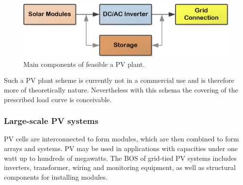 \begin{figure}[!h] 
\centering
\includegraphics[width=0.75\linewidth]{FIG/PVMainComp}
\caption[Main components of feasible a PV plant.]{Main components of feasible a PV plant.}\label{PVMainComp}
\end{figure}
Such a \ac{PV} plant scheme is currently not in a commercial use and is therefore more of theoretically nature. Nevertheless with this schema the covering of the prescribed load curve is conceivable.
\subsubsection{Large-scale PV systems}
\ac{PV} cells are interconnected to form modules, which are then combined to form arrays and systems. \ac{PV} may be used in applications with capacities under one watt up to hundreds of megawatts. The \ac{BOS} of grid-tied \ac{PV} systems includes inverters, transformer, wiring and monitoring equipment, as well as structural components for installing modules.  

